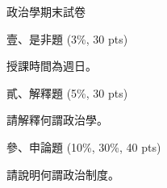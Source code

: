 \documentclass[14pt,a4paper,addpoints]{exam}
\begin{document}
    \begin{center}
    \fontsize{15pt}{15pt}\selectfont
    政治學期末試卷 \\
    \end{center}
    \vspace{0.3cm}
    \fontsize{14pt}{14pt}\selectfont
    壹、是非題 (3\%, 30 pts) \\
    \begin{questions}
    \question[3] 授課時間為週日。
    \end{questions}
    \vspace{0.3cm}
    貳、解釋題 (5\%, 30 pts) \\
    \begin{questions}
    \question[5] 請解釋何謂政治學。
    \end{questions}
    \vspace{0.3cm}
    參、申論題 (10\%, 30\%, 40 pts) \\
    \begin{questions}
    \question[] 請說明何謂政治制度。
    \end{questions}
\end{document}

